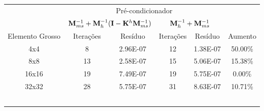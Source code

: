 \begin{table}[]
\begin{tabular}{cccccc}
\cline{2-5}
\multicolumn{1}{c|}{}                 & \multicolumn{4}{c|}{Pré-condicionador}                                                                                          &                              \\ \cline{2-5}
\multicolumn{1}{c|}{}                 & \multicolumn{2}{c|}{$\mathbf{M}^{-1}_{ms} +\mathbf{M}^{-1}_{h}(\mathbf{I}- \mathbf{K}^h \mathbf{M}^{-1}_{ms})$}                             & \multicolumn{2}{c|}{$\mathbf{M}^{-1}_{h} + \mathbf{M}^{-1}_{ms}$}                              &                              \\ \hline
\multicolumn{1}{|c|}{Elemento Grosso} & \multicolumn{1}{c|}{Iterações} & \multicolumn{1}{c|}{Resíduo}  & \multicolumn{1}{c|}{Iterações} & \multicolumn{1}{c|}{Resíduo}  & \multicolumn{1}{c|}{Aumento} \\ \hline
\multicolumn{1}{|c|}{4x4}             & \multicolumn{1}{c|}{8}         & \multicolumn{1}{c|}{2.96E-07} & \multicolumn{1}{c|}{12}        & \multicolumn{1}{c|}{1.38E-07} & \multicolumn{1}{c|}{50.00\%} \\ \hline
\multicolumn{1}{|c|}{8x8}             & \multicolumn{1}{c|}{13}        & \multicolumn{1}{c|}{2.58E-07} & \multicolumn{1}{c|}{15}        & \multicolumn{1}{c|}{5.06E-07} & \multicolumn{1}{c|}{15.38\%} \\ \hline
\multicolumn{1}{|c|}{16x16}           & \multicolumn{1}{c|}{19}        & \multicolumn{1}{c|}{7.49E-07} & \multicolumn{1}{c|}{19}        & \multicolumn{1}{c|}{5.75E-07} & \multicolumn{1}{c|}{0.00\%}  \\ \hline
\multicolumn{1}{|c|}{32x32}           & \multicolumn{1}{c|}{28}        & \multicolumn{1}{c|}{5.75E-07} & \multicolumn{1}{c|}{31}        & \multicolumn{1}{c|}{8.63E-07} & \multicolumn{1}{c|}{10.71\%} \\ \hline
                                      &                                &                               &                                &                               &                              \\
\multicolumn{1}{l}{}                  & \multicolumn{1}{l}{}           & \multicolumn{1}{l}{}          & \multicolumn{1}{l}{}           & \multicolumn{1}{l}{}          & \multicolumn{1}{l}{}         \\
\multicolumn{1}{l}{}                  & \multicolumn{1}{l}{}           & \multicolumn{1}{l}{}          & \multicolumn{1}{l}{}           & \multicolumn{1}{l}{}          & \multicolumn{1}{l}{}         \\
\multicolumn{1}{l}{}                  & \multicolumn{1}{l}{}           & \multicolumn{1}{l}{}          & \multicolumn{1}{l}{}           & \multicolumn{1}{l}{}          & \multicolumn{1}{l}{}         \\
\multicolumn{1}{l}{}                  & \multicolumn{1}{l}{}           & \multicolumn{1}{l}{}          & \multicolumn{1}{l}{}           & \multicolumn{1}{l}{}          & \multicolumn{1}{l}{}        
\end{tabular}
\end{table}

